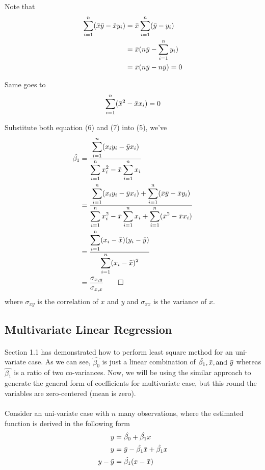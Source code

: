 \documentclass{article}
\begin{document}
Note that 
\begin{equation}
\begin{split}
\displaystyle\sum_{i=1}^{n} (\Bar{x}\Bar{y}-\Bar{x}y_i) &=
\Bar{x}\displaystyle\sum_{i=1}^{n}(\Bar{y}-y_i) \\
&= \Bar{x}(n\Bar{y}-\displaystyle\sum_{i=1}^{n}y_i) \\
&= \Bar{x}(n\Bar{y}-n\Bar{y}) = 0
\end{split}
\end{equation}

Same goes to 
\begin{equation}
\displaystyle\sum_{i=1}^{n} (\Bar{x}^2 - \Bar{x}x_i) = 0
\end{equation}

Substitute both equation (6) and (7) into (5), we've
\begin{align*}
\hat{\beta_1} &= \frac{\displaystyle\sum_{i=1}^{n} (x_i y_i - \Bar{y}x_i)}{\displaystyle\sum_{i=1}^{n} {x_i^2 - \Bar{x}\displaystyle\sum_{i=1}^{n}x_i}} \\
&= \frac{\displaystyle\sum_{i=1}^{n} (x_i y_i - \Bar{y}x_i)+\displaystyle\sum_{i=1}^{n} (\Bar{x}\Bar{y}-\Bar{x}y_i)}{\displaystyle\sum_{i=1}^{n} {x_i^2 - \Bar{x}\displaystyle\sum_{i=1}^{n}x_i}+\displaystyle\sum_{i=1}^{n} (\Bar{x}^2 - \Bar{x}x_i)} \\
&= \frac{\displaystyle\sum_{i=1}^{n}(x_i - \Bar{x})(y_i - \Bar{y})}{\displaystyle\sum_{i=1}^{n}(x_i - \Bar{x})^2} \\
&= \frac{\sigma_{x,y}}{\sigma_{x,x}} \qed
\end{align*} where $\sigma_{xy}$ is the correlation of $x$ and $y$ and $\sigma_{xx}$ is the variance of $x$.

\subsection{Multivariate Linear Regression}
\paragraph{}
Section 1.1 has demonstrated how to perform least square method for an uni-variate case. As we can see, $\hat{\beta_0}$ is just a linear combination of $\hat{\beta_1}, \Bar{x}, \text{and } \Bar{y}$ whereas $\hat{\beta_1}$ is a ratio of two co-variances. Now, we will be using the similar approach to generate the general form of coefficients for multivariate case, but this round the variables are zero-centered (mean is zero).
\paragraph{}
Consider an uni-variate case with $n$ many observations, where the estimated function is derived in the following form
\begin{align*}
    y &= \hat{\beta_0} + \hat{\beta_1}x \\
    y &= \Bar{y} - \hat{\beta_1}\Bar{x} + \hat{\beta_1}x \\
    y - \Bar{y} &= \hat{\beta_1}(x - \Bar{x})
\end{align*}
\end{document}
